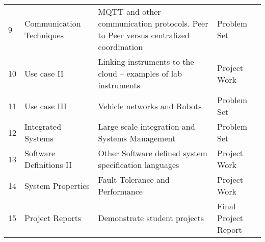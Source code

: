 \begin{table}[h]
\begin{tabular}{p{1cm}p{4cm}p{6cm}p{2cm}}
9     & Communication Techniques & MQTT and other communication protocols. Peer to Peer versus centralized coordination                                 & Problem Set          \\
10    & Use case II              & Linking instruments to the cloud – examples of lab instruments                                                       & Project Work         \\
11    & Use case III             & Vehicle networks and Robots                                                                                          & Problem Set          \\
12    & Integrated Systems       & Large scale integration and Systems Management                                                                       & Problem Set          \\
13    & Software Definitions II  & Other Software defined system specification languages                                                                & Project Work         \\
14    & System Properties        & Fault Tolerance and Performance                                                                                      & Project Work         \\
15    & Project Reports          & Demonstrate student projects                                                                                         & Final Project Report
\end{tabular}
\end{table}